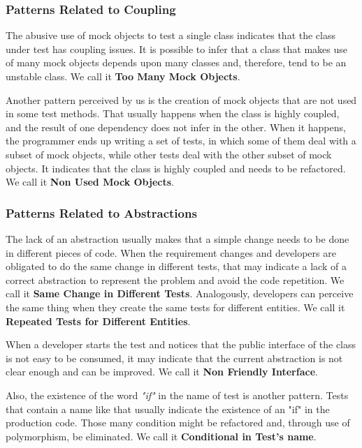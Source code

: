 \documentclass[conference]{IEEEtran}
\begin{document}
\begin{framed}
\begin{framed}
\subsubsection{Patterns Related to Coupling}

The abusive use of mock objects to test a single class indicates that
the class under test has coupling issues. It is possible to infer that a class
that makes use of many mock objects depends upon many classes and, therefore,
tend to be an unstable class. We call it \textbf{Too Many Mock Objects}.

Another pattern perceived by us is the creation of mock objects that are
not used in some test methods. That usually happens when the class
is highly coupled, and the result of one dependency does not infer in
the other. When it happens, the programmer ends up writing a set of tests,
in which some of them deal with a subset of mock objects, while other
tests deal with the other subset of mock objects. It indicates that
the class is highly coupled and needs to be refactored. We call it
\textbf{Non Used Mock Objects}.

\subsubsection{Patterns Related to Abstractions}

The lack of an abstraction usually makes that a simple change needs to
be done in different pieces of code. When the requirement changes and
developers are obligated to do the same change in different tests,
that may indicate a lack of a correct abstraction to represent the problem
and avoid the code repetition. We call it \textbf{Same Change in Different Tests}.
Analogously, developers can perceive the same thing when they create the
same tests for different entities. We call it \textbf{Repeated Tests for Different Entities}.

When a developer starts the test and notices that the public interface of the class
is not easy to be consumed, it may indicate that the current abstraction is not
clear enough and can be improved. We call it \textbf{Non Friendly Interface}.

Also, the existence of the word \textit{"if"} in the name of test is another
pattern. Tests that contain a name like that usually indicate the existence
of an "if" in the production code. Those many condition might be refactored and,
through use of polymorphism, be eliminated. We call it \textbf{Conditional in Test's name}.


\end{framed}
\end{framed}
\end{document}

